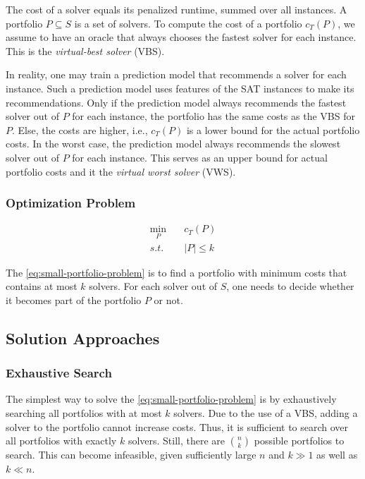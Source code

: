 \documentclass[conference]{IEEEtran}
\begin{document}
The cost of a solver equals its penalized runtime, summed over all instances.
A portfolio $P \subseteq S$ is a set of solvers.
To compute the cost of a portfolio $c_{T}(P)$, we assume to have an oracle that always chooses the fastest solver for each instance.
This is the \emph{virtual-best solver} (VBS).

In reality, one may train a prediction model that recommends a solver for each instance.
Such a prediction model uses features of the SAT instances to make its recommendations.
Only if the prediction model always recommends the fastest solver out of $P$ for each instance, the portfolio has the same costs as the VBS for $P$.
Else, the costs are higher, i.e., $c_{T}(P)$ is a lower bound for the actual portfolio costs.
In the worst case, the prediction model always recommends the slowest solver out of $P$ for each instance.
This serves as an upper bound for actual portfolio costs and it the \emph{virtual worst solver} (VWS).

\subsubsection{Optimization Problem}

\begin{equation}
	\label{eq:small-portfolio-problem}
	\begin{aligned}
		\min_P \quad & c_{T}(P)\\
		s.t. \quad & |P| \leq k
	\end{aligned}
   \tag{Small-Portfolio Problem}
\end{equation}

The \ref{eq:small-portfolio-problem} is to find a portfolio with minimum costs that contains at most $k$ solvers.
For each solver out of $S$, one needs to decide whether it becomes part of the portfolio $P$ or not.

\subsection{Solution Approaches}
\label{sec:approach:solution}

\subsubsection{Exhaustive Search}

The simplest way to solve the \ref{eq:small-portfolio-problem} is by exhaustively searching all portfolios with at most $k$ solvers.
Due to the use of a VBS, adding a solver to the portfolio cannot increase costs.
Thus, it is sufficient to search over all portfolios with exactly $k$ solvers.
Still, there are $\binom{n}{k}$ possible portfolios to search.
This can become infeasible, given sufficiently large $n$ and $k \gg 1$ as well as $k \ll n$.
\end{document}
